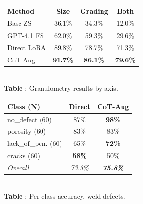 \documentclass{bmvc2k}
\begin{document}
\begin{table}[t]
\scriptsize
\centering
\begin{minipage}[t]{0.46\textwidth}
\centering
\vspace{0pt}
\label{tab:granulometry}
\begin{tabular}{lccc}
\toprule
Method & Size & Grading & Both \\
\midrule
Base ZS & 36.1\% & 34.3\% & 12.0\% \\
GPT-4.1 FS & 62.0\% & 59.3\% & 29.6\% \\
Direct LoRA & 89.8\% & 78.7\% & 71.3\% \\
CoT-Aug & \textbf{91.7\%} & \textbf{86.1\%} & \textbf{79.6\%} \\
\bottomrule
\end{tabular}\\[4pt]
{\small\textcolor{bmv@captioncolor}{\textbf{Table }: Granulometry results by axis.}}
\end{minipage}%
\hfill
\begin{minipage}[t]{0.46\textwidth}
\centering
\vspace{0pt}
\label{tab:weld_perclass}
\begin{tabular}{lcc}
\toprule
Class (N) & Direct & CoT-Aug \\
\midrule
no\_defect (60) & 87\% & \textbf{98\%} \\
porosity (60) & 83\% & 83\% \\
lack\_of\_pen. (60) & 65\% & \textbf{72\%} \\
cracks (60) & \textbf{58\%} & 50\% \\
\midrule
\textit{Overall} & \textit{73.3\%} & \textit{\textbf{75.8\%}} \\
\bottomrule
\end{tabular}\\[4pt]
{\small\textcolor{bmv@captioncolor}{\textbf{Table }: Per-class accuracy, weld defects.}}
\end{minipage}

\vspace{12pt}


\end{table}
\end{document}
